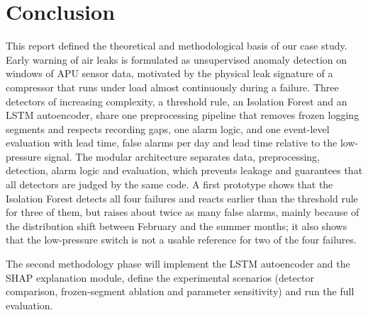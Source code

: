 \section{Conclusion}
\label{sec:conclusion}
This report defined the theoretical and methodological basis of our case study. Early warning of air leaks is formulated as unsupervised anomaly detection on windows of APU sensor data, motivated by the physical leak signature of a compressor that runs under load almost continuously during a failure. Three detectors of increasing complexity, a threshold rule, an Isolation Forest and an LSTM autoencoder, share one preprocessing pipeline that removes frozen logging segments and respects recording gaps, one alarm logic, and one event-level evaluation with lead time, false alarms per day and lead time relative to the low-pressure signal. The modular architecture separates data, preprocessing, detection, alarm logic and evaluation, which prevents leakage and guarantees that all detectors are judged by the same code. A first prototype shows that the Isolation Forest detects all four failures and reacts earlier than the threshold rule for three of them, but raises about twice as many false alarms, mainly because of the distribution shift between February and the summer months; it also shows that the low-pressure switch is not a usable reference for two of the four failures.

The second methodology phase will implement the LSTM autoencoder and the SHAP explanation module, define the experimental scenarios (detector comparison, frozen-segment ablation and parameter sensitivity) and run the full evaluation.
